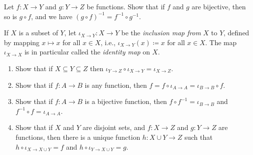 \begin{exercise} \label{exercise 3.3.7}
Let \(f : X \rightarrow Y\) and \(g : Y \rightarrow Z\) be functions. Show that if \(f\) and \(g\) are bijective, then so is \(g \circ f\), and we have \((g \circ f)^{-1} = f^{-1} \circ g^{-1}\).
\end{exercise}

\begin{exercise} \label{exercise 3.3.8}
If \(X\) is a subset of \(Y\), let \(\iota_{X \to Y} : X \to Y\) be the \emph{inclusion map from} \(X\) to \(Y\), defined by mapping \(x \mapsto x\) for all \(x \in X\), i.e., \(\iota_{X \to Y}(x) \coloneqq x\) for all \(x \in X\). The map \(\iota_{X \to X}\) is in particular called the \emph{identity map} on \(X\).
    \begin{enumerate}
        \item Show that if \(X \subseteq Y \subseteq Z\) then \(\iota_{Y \to Z} \circ \iota_{X \to Y} = \iota_{X \to Z}\).
        \item Show that if \(f : A \to B\) is any function, then \(f = f \circ \iota_{A \to A} = \iota_{B \to B} \circ f\).
        \item Show that if \(f : A \to B\) is a bijective function, then \(f \circ f^{-1} = \iota_{B \to B}\) and \(f^{-1} \circ f = \iota_{A \to A}\).
        \item Show that if \(X\) and \(Y\) are disjoint sets, and \(f : X \to Z\) and \(g : Y \to Z\) are functions, then there is a unique function \(h : X \cup Y \to Z\) such that \(h \circ \iota_{X \to X \cup Y} = f\) and \(h \circ \iota_{Y \to X \cup Y} = g\).
    \end{enumerate}
\end{exercise}